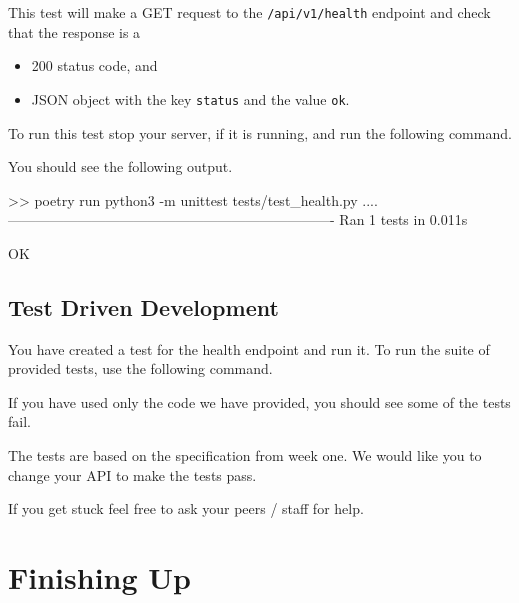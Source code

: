 \documentclass{csse4400}
\begin{document}
This test will make a GET request to the \texttt{/api/v1/health} endpoint and check that the response is a 
\begin{itemize}
  \item 200 status code, and
  \item JSON object with the key \texttt{status} and the value \texttt{ok}.
\end{itemize}

To run this test stop your server, if it is running, and run the following command.


You should see the following output.

\begin{code}[language=bash,numbers=none]{}
  >> poetry run python3 -m unittest tests/test_health.py
  ....
  ----------------------------------------------------------------------
  Ran 1 tests in 0.011s

  OK
\end{code}

\subsection{Test Driven Development}

You have created a test for the health endpoint and run it.
To run the suite of provided tests, use the following command.


If you have used only the code we have provided, you should see some of the tests fail.

The tests are based on the specification from week one.
We would like you to change your API to make the tests pass.


If you get stuck feel free to ask your peers / staff for help.


\section{Finishing Up}
\end{document}
